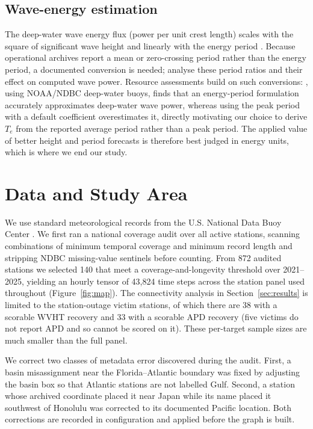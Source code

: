 \documentclass[11pt]{article}
\begin{document}
\subsection{Wave-energy estimation}
The deep-water wave energy flux (power per unit crest length) scales with the
square of significant wave height and linearly with the energy period
\citep{cahill2014}. Because operational archives report a mean or zero-crossing
period rather than the energy period, a documented conversion is needed;
\citet{cahill2014} analyse these period ratios and their effect on computed wave
power. Resource assessments build on such conversions:
\citet{guillou2020}, using NOAA/NDBC deep-water buoys, finds that an energy-period
formulation accurately approximates deep-water wave power, whereas using the peak
period with a default coefficient overestimates it, directly motivating our
choice to derive $T_e$ from the reported average period rather than a peak period.
The applied value of better height and period forecasts is therefore best judged
in energy units, which is where we end our study.

\section{Data and Study Area}
\label{sec:data}
We use standard meteorological records from the U.S. National Data Buoy Center
\citep{ndbc}. We first ran a national coverage audit over all active stations,
scanning combinations of minimum temporal coverage and minimum record length and
stripping NDBC missing-value sentinels before counting. From 872 audited
stations we selected 140 that meet a coverage-and-longevity threshold
over 2021--2025, yielding an hourly tensor of 43{,}824 time steps across the
station panel used throughout (Figure~\ref{fig:map}). The connectivity analysis
in Section~\ref{sec:results}
is limited to the station-outage victim stations, of which there are 38 with a
scorable WVHT recovery and 33 with a scorable APD recovery (five victims do not
report APD and so cannot be scored on it). These per-target sample sizes are much
smaller than the full panel.

We correct two classes of metadata error discovered during the audit. First, a
basin misassignment near the Florida--Atlantic boundary was fixed by adjusting
the basin box so that Atlantic stations are not labelled Gulf. Second, a station
whose archived coordinate placed it near Japan while its name placed it southwest
of Honolulu was corrected to its documented Pacific location. Both corrections
are recorded in configuration and applied before the graph is built.
\end{document}
